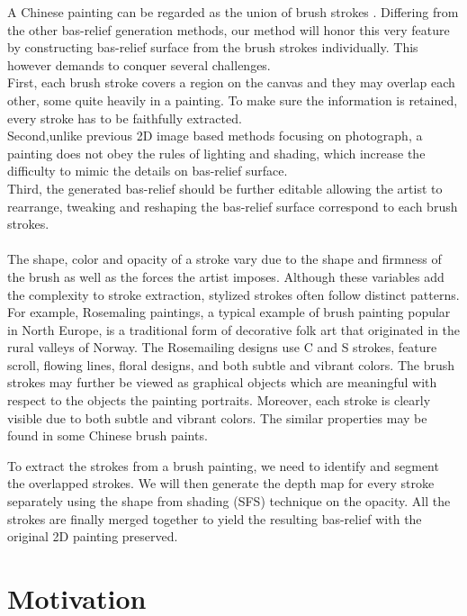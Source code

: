 A Chinese painting can be regarded as the union of brush strokes \cite{xu2006animating}. Differing from the other bas-relief generation methods, our method will honor this very feature by constructing bas-relief surface from the brush strokes individually. This however demands to conquer several challenges. \\
First, each brush stroke covers a region on the canvas and they may overlap each other, some quite heavily in a painting. To make sure the information is retained, every stroke has to be faithfully extracted.\\ Second,unlike previous 2D image based methods focusing on photograph, a painting does not obey the rules of lighting and shading, which increase the difficulty to mimic the details on bas-relief surface. \\Third, the generated bas-relief should be further editable allowing the artist to rearrange, tweaking and reshaping the bas-relief surface correspond to each brush strokes. \\  \\

The shape, color and opacity of a stroke vary due to the shape and firmness of the brush as well as the forces the artist imposes. Although these variables add the complexity to stroke extraction, stylized strokes often follow distinct patterns. For example, Rosemaling paintings, a typical example of brush painting popular in North Europe, is a traditional form of decorative folk art that originated in the rural valleys of Norway. The Rosemailing designs use C and S strokes, feature scroll, flowing lines, floral designs, and both subtle and vibrant colors. The brush strokes may further be viewed as graphical objects which are meaningful with respect to the objects the painting portraits. Moreover, each stroke is clearly visible due to both subtle and vibrant colors. The similar properties may be found in some Chinese brush paints.

To extract the strokes from a brush painting, we need to identify and segment the overlapped strokes. We will then generate the depth map for every stroke separately using the shape from shading (SFS) technique on the opacity. All the strokes are finally merged together to yield the resulting bas-relief with the original 2D painting preserved. 

\section{Motivation}

